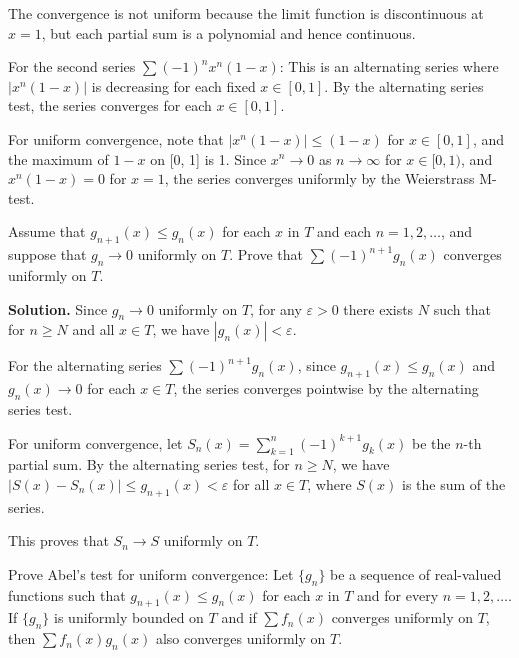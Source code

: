 The convergence is not uniform because the limit function is discontinuous at \( x = 1 \), but each partial sum is a polynomial and hence continuous.

For the second series \( \sum (-1)^n x^n (1 - x) \): This is an alternating series where \( |x^n (1 - x)| \) is decreasing for each fixed \( x \in [0, 1] \). By the alternating series test, the series converges for each \( x \in [0, 1] \).

For uniform convergence, note that \( |x^n (1 - x)| \leq (1 - x) \) for \( x \in [0, 1] \), and the maximum of \( 1 - x \) on [0, 1] is 1. Since \( x^n \to 0 \) as \( n \to \infty \) for \( x \in [0, 1) \), and \( x^n (1 - x) = 0 \) for \( x = 1 \), the series converges uniformly by the Weierstrass M-test.

\begin{problembox}
Assume that \( g_{n+1}(x) \leq g_n(x) \) for each \( x \) in \( T \) and each \( n = 1, 2, \ldots \), and suppose that \( g_n \to 0 \) uniformly on \( T \). Prove that \( \sum (-1)^{n+1} g_n(x) \) converges uniformly on \( T \).
\end{problembox}

\noindent\textbf{Solution.} Since \( g_n \to 0 \) uniformly on \( T \), for any \( \varepsilon > 0 \) there exists \( N \) such that for \( n \geq N \) and all \( x \in T \), we have \( |g_n(x)| < \varepsilon \).

For the alternating series \( \sum (-1)^{n+1} g_n(x) \), since \( g_{n+1}(x) \leq g_n(x) \) and \( g_n(x) \to 0 \) for each \( x \in T \), the series converges pointwise by the alternating series test.

For uniform convergence, let \( S_n(x) = \sum_{k=1}^n (-1)^{k+1} g_k(x) \) be the \( n \)-th partial sum. By the alternating series test, for \( n \geq N \), we have \( |S(x) - S_n(x)| \leq g_{n+1}(x) < \varepsilon \) for all \( x \in T \), where \( S(x) \) is the sum of the series.

This proves that \( S_n \to S \) uniformly on \( T \).

\begin{problembox}
Prove Abel's test for uniform convergence: Let \( \{g_n\} \) be a sequence of real-valued functions such that \( g_{n+1}(x) \leq g_n(x) \) for each \( x \) in \( T \) and for every \( n = 1, 2, \ldots \). If \( \{g_n\} \) is uniformly bounded on \( T \) and if \(\sum f_n(x)\) converges uniformly on \( T \), then \(\sum f_n(x)g_n(x)\) also converges uniformly on \( T \).
\end{problembox}


